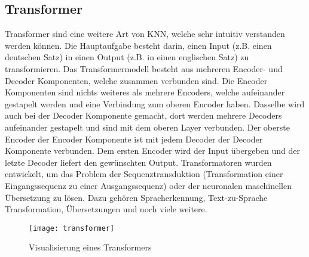 \subsection{Transformer}
\label{sub:transformer}
Transformer sind eine weitere Art von \gls{KNN}, welche sehr intuitiv verstanden werden können. Die
Hauptaufgabe besteht darin, einen Input (z.B. einen deutschen Satz) in einen Output (z.B. in einen englischen Satz) zu
transformieren. Das Transformermodell besteht aus mehreren Encoder- und Decoder Komponenten, welche zusammen verbunden
sind. Die Encoder Komponenten sind nichts weiteres als mehrere Encoders, welche aufeinander gestapelt werden und eine
Verbindung zum oberen Encoder haben. Dasselbe wird auch bei der Decoder Komponente gemacht, dort werden mehrere
Decoders aufeinander gestapelt und sind mit dem oberen Layer verbunden. Der oberste Encoder der Encoder Komponente ist
mit jedem Decoder der Decoder Komponente verbunden. Dem ersten Encoder wird der Input übergeben und der letzte Decoder
liefert den gewünschten Output.
\newline
\newline
Transformatoren wurden entwickelt, um das Problem der Sequenztransduktion (Transformation einer Eingangssequenz zu einer
Ausgangssequenz) oder der neuronalen maschinellen Übersetzung zu lösen. Dazu gehören Spracherkennung, Text-zu-Sprache
Transformation, Übersetzungen und noch viele weitere.
\begin{figure}[H]
	\centering
	\texttt{[image: transformer]}
	\caption{Visualisierung eines Transformers}
	\label{fig:Transformer}
\end{figure}

